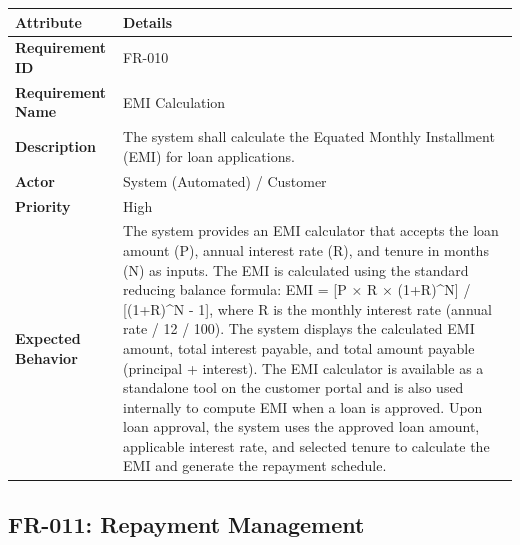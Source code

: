 \documentclass[12pt,a4paper,oneside]{report}
\begin{document}
\begin{table}[htbp]
\centering
\small
\begin{tabularx}{\textwidth}{l l}
\toprule
\textbf{Attribute} & \textbf{Details} \\
\midrule
\textbf{Requirement ID} & FR-010 \\
\textbf{Requirement Name} & EMI Calculation \\
\textbf{Description} & The system shall calculate the Equated Monthly Installment (EMI) for loan applications. \\
\textbf{Actor} & System (Automated) / Customer \\
\textbf{Priority} & High \\
\textbf{Expected Behavior} & The system provides an EMI calculator that accepts the loan amount (P), annual interest rate (R), and tenure in months (N) as inputs. The EMI is calculated using the standard reducing balance formula: EMI = [P × R × (1+R)^N] / [(1+R)^N - 1], where R is the monthly interest rate (annual rate / 12 / 100). The system displays the calculated EMI amount, total interest payable, and total amount payable (principal + interest). The EMI calculator is available as a standalone tool on the customer portal and is also used internally to compute EMI when a loan is approved. Upon loan approval, the system uses the approved loan amount, applicable interest rate, and selected tenure to calculate the EMI and generate the repayment schedule. \\
\bottomrule
\end{tabularx}
\end{table}

\subsection{FR-011: Repayment Management}
\end{document}
